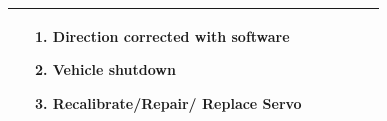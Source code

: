 \documentclass [10pt]{article}
\begin{document}
{\begin{minipage}{\textwidth}
\begin{longtable}{ |p{ }  | p{ } |  p{ } |  p{ } | p{ } | p{ } |  p{ }|}
    
    & \begin{minipage}{.24 \columnwidth} 
                \vspace{2mm}
                \begin{enumerate}
                    \item Direction corrected with software
                    \item Vehicle shutdown 
                    \item Recalibrate/Repair/ Replace Servo \vspace {1mm}
                \end{enumerate}
        \end{minipage} \\ \hline
    
   
    
    
    

\end{longtable}
\end{minipage}}
\end{document}
